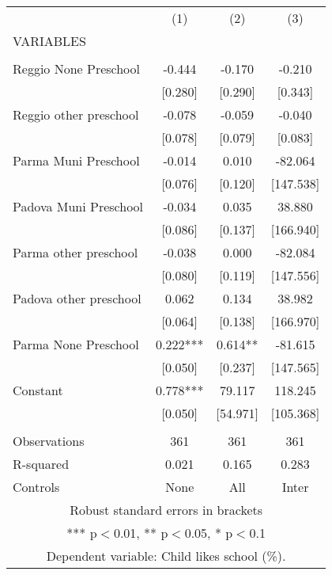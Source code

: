 \begin{tabular}{lccc} \hline
 & (1) & (2) & (3) \\
VARIABLES &  &  &  \\ \hline
 &  &  &  \\
Reggio None Preschool & -0.444 & -0.170 & -0.210 \\
 & [0.280] & [0.290] & [0.343] \\
Reggio other preschool & -0.078 & -0.059 & -0.040 \\
 & [0.078] & [0.079] & [0.083] \\
Parma Muni Preschool & -0.014 & 0.010 & -82.064 \\
 & [0.076] & [0.120] & [147.538] \\
Padova Muni Preschool & -0.034 & 0.035 & 38.880 \\
 & [0.086] & [0.137] & [166.940] \\
Parma other preschool & -0.038 & 0.000 & -82.084 \\
 & [0.080] & [0.119] & [147.556] \\
Padova other preschool & 0.062 & 0.134 & 38.982 \\
 & [0.064] & [0.138] & [166.970] \\
Parma None Preschool & 0.222*** & 0.614** & -81.615 \\
 & [0.050] & [0.237] & [147.565] \\
Constant & 0.778*** & 79.117 & 118.245 \\
 & [0.050] & [54.971] & [105.368] \\
 &  &  &  \\
Observations & 361 & 361 & 361 \\
R-squared & 0.021 & 0.165 & 0.283 \\
 Controls & None & All & Inter \\ \hline
\multicolumn{4}{c}{ Robust standard errors in brackets} \\
\multicolumn{4}{c}{ *** p$<$0.01, ** p$<$0.05, * p$<$0.1} \\
\multicolumn{4}{c}{ Dependent variable: Child likes school (\%).} \\
\end{tabular}
